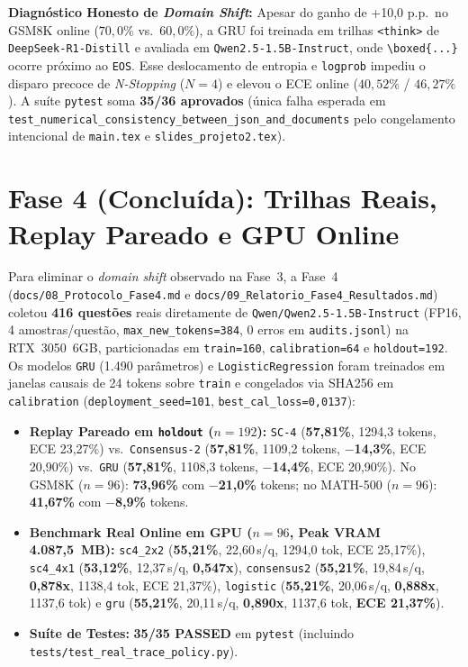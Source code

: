 \documentclass[11pt,a4paper]{article}
\begin{document}
\textbf{Diagnóstico Honesto de \emph{Domain Shift}:} Apesar do ganho de +10,0 p.p.\ no GSM8K online ($70{,}0\%$ vs.\ $60{,}0\%$), a GRU foi treinada em trilhas \texttt{<think>} de \texttt{DeepSeek-R1-Distill} e avaliada em \texttt{Qwen2.5-1.5B-Instruct}, onde \verb|\boxed{...}| ocorre próximo ao \texttt{EOS}. Esse deslocamento de entropia e \texttt{logprob} impediu o disparo precoce de \emph{N-Stopping} ($N=4$) e elevou o ECE online ($40{,}52\%$ / $46{,}27\%$). A suíte \texttt{pytest} soma \textbf{35/36 aprovados} (única falha esperada em \texttt{test\_numerical\_consistency\_between\_json\_and\_documents} pelo congelamento intencional de \texttt{main.tex} e \texttt{slides\_projeto2.tex}).

\section{Fase 4 (Concluída): Trilhas Reais, Replay Pareado e GPU Online}

Para eliminar o \emph{domain shift} observado na Fase~3, a Fase~4 (\texttt{docs/08\_Protocolo\_Fase4.md} e \texttt{docs/09\_Relatorio\_Fase4\_Resultados.md}) coletou \textbf{416 questões} reais diretamente de \texttt{Qwen/Qwen2.5-1.5B-Instruct} (FP16, 4 amostras/questão, \texttt{max\_new\_tokens=384}, 0 erros em \texttt{audits.jsonl}) na RTX~3050~6GB, particionadas em \texttt{train=160}, \texttt{calibration=64} e \texttt{holdout=192}. Os modelos \texttt{GRU} (1.490 parâmetros) e \texttt{LogisticRegression} foram treinados em janelas causais de 24 tokens sobre \texttt{train} e congelados via SHA256 em \texttt{calibration} (\texttt{deployment\_seed=101}, \texttt{best\_cal\_loss=0,0137}):

\begin{itemize}[leftmargin=1.4em,itemsep=2pt]
  \item \textbf{Replay Pareado em \texttt{holdout} ($n=192$):} \texttt{SC-4} (\textbf{57,81\%}, 1294,3 tokens, ECE 23,27\%) vs.\ \texttt{Consensus-2} (\textbf{57,81\%}, 1109,2 tokens, \textbf{$-$14,3\%}, ECE 20,90\%) vs.\ \texttt{GRU} (\textbf{57,81\%}, 1108,3 tokens, \textbf{$-$14,4\%}, ECE 20,90\%). No GSM8K ($n=96$): \textbf{73,96\%} com \textbf{$-$21,0\%} tokens; no MATH-500 ($n=96$): \textbf{41,67\%} com \textbf{$-$8,9\%} tokens.
  \item \textbf{Benchmark Real Online em GPU ($n=96$, Peak VRAM 4.087,5~MB):} \texttt{sc4\_2x2} (\textbf{55,21\%}, 22,60\,s/q, 1294,0 tok, ECE 25,17\%), \texttt{sc4\_4x1} (\textbf{53,12\%}, 12,37\,s/q, \textbf{0,547x}), \texttt{consensus2} (\textbf{55,21\%}, 19,84\,s/q, \textbf{0,878x}, 1138,4 tok, ECE 21,37\%), \texttt{logistic} (\textbf{55,21\%}, 20,06\,s/q, \textbf{0,888x}, 1137,6 tok) e \texttt{gru} (\textbf{55,21\%}, 20,11\,s/q, \textbf{0,890x}, 1137,6 tok, \textbf{ECE 21,37\%}).
  \item \textbf{Suíte de Testes:} \textbf{35/35 PASSED} em \texttt{pytest} (incluindo \texttt{tests/test\_real\_trace\_policy.py}).
\end{itemize}
\end{document}
